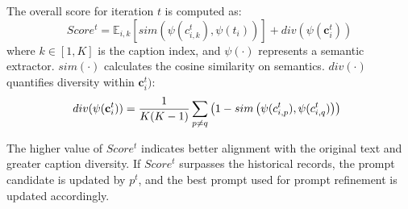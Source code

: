 \noindent The overall score for iteration $t$ is computed as:
\begin{equation}
Score^t = \mathbb{E}_{i,k}[sim(\psi(c^t_{i,k}),\psi(t_i))] + div(\psi(\mathbf{c}^t_i))
\label{eq:score}
\end{equation}
where $k \in [1,K]$ is the caption index, and $\psi(\cdot)$ represents a semantic extractor. $sim(\cdot)$ calculates the cosine similarity on semantics. $div(\cdot)$ quantifies diversity within $\mathbf{c}^t_i)$:
\begin{equation}
\hspace{-0.5em} div(\psi(\mathbf{c}^t_i)) = \frac{1}{K(K-1)} \sum_{p \neq q} \left( 1 - sim \left( \psi(c_{i,p}^t), \psi(c_{i,q}^t) \right) \right)
\label{eq:div}
\end{equation}






\noindent The higher value of $Score^t$ indicates better alignment with the original text and greater caption diversity. 
If $Score^t$ surpasses the historical records, the prompt candidate is updated by $p^t$, and the best prompt used for prompt refinement is updated accordingly.




